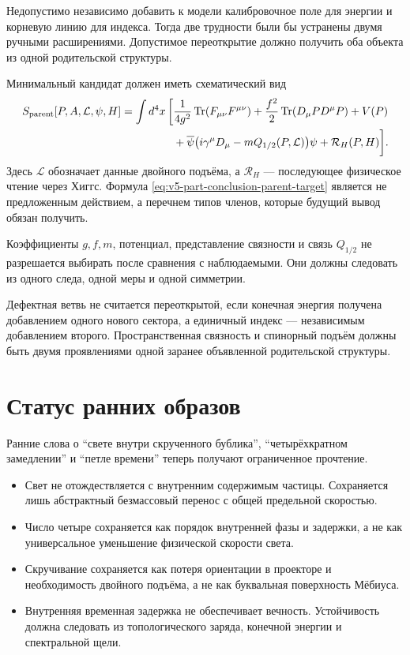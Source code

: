 Недопустимо независимо добавить к модели калибровочное поле для энергии и
корневую линию для индекса. Тогда две трудности были бы устранены двумя
ручными расширениями. Допустимое переоткрытие должно получить оба объекта
из одной родительской структуры.

Минимальный кандидат должен иметь схематический вид
\begin{equation}
 \begin{split}
 S_{\rm parent}[P,A,\mathcal L,\psi,H]
 =\int d^4x\,\bigg[
 &\frac1{4g^2}\operatorname{Tr}(F_{\mu\nu}F^{\mu\nu})
 +\frac{f^2}{2}\operatorname{Tr}(D_\mu P D^\mu P)
 +V(P)
 \\
 &+\overline\psi\bigl(i\gamma^\mu D_\mu-mQ_{1/2}(P,\mathcal L)\bigr)\psi
 +\mathcal R_H(P,H)\bigg].
 \end{split}
 \label{eq:v5-part-conclusion-parent-target}
\end{equation}
Здесь $\mathcal L$ обозначает данные двойного подъёма, а
$\mathcal R_H$ --- последующее физическое чтение через Хиггс. Формула
\eqref{eq:v5-part-conclusion-parent-target} является не предложенным
действием, а перечнем типов членов, которые будущий вывод обязан получить.

Коэффициенты $g,f,m$, потенциал, представление связности и связь
$Q_{1/2}$ не разрешается выбирать после сравнения с наблюдаемыми. Они
должны следовать из одного следа, одной меры и одной симметрии.

\begin{nogocriterion}
Дефектная ветвь не считается переоткрытой, если конечная энергия получена
добавлением одного нового сектора, а единичный индекс --- независимым
добавлением второго. Пространственная связность и спинорный подъём должны
быть двумя проявлениями одной заранее объявленной родительской структуры.
\end{nogocriterion}

\section{Статус ранних образов}

Ранние слова о ``свете внутри скрученного бублика'', ``четырёхкратном
замедлении'' и ``петле времени'' теперь получают ограниченное прочтение.

\begin{itemize}
 \item Свет не отождествляется с внутренним содержимым частицы. Сохраняется
 лишь абстрактный безмассовый перенос с общей предельной скоростью.
 \item Число четыре сохраняется как порядок внутренней фазы и задержки, а
 не как универсальное уменьшение физической скорости света.
 \item Скручивание сохраняется как потеря ориентации в проекторе и
 необходимость двойного подъёма, а не как буквальная поверхность Мёбиуса.
 \item Внутренняя временная задержка не обеспечивает вечность. Устойчивость
 должна следовать из топологического заряда, конечной энергии и спектральной
 щели.
\end{itemize}

